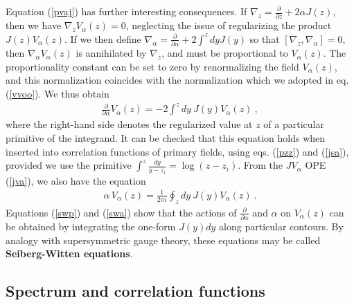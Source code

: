 \documentclass[12pt,a4paper,notitlepage]{report}
\newcommand \p {\partial}
\newcommand \pp[1] {{\frac{\p}{\p #1}}}
\numberwithin{equation}{section}
\theoremstyle{break}
\begin{document}
Equation (\ref{pvaj}) has further interesting consequences. If $\nabla_z=\pp{z} +2\alpha J(z)$, then we have $\nabla_z V_\alpha(z)=0$, neglecting the issue of regularizing the product $J(z)V_\alpha(z)$. If we then define $\nabla_\alpha = \pp{\alpha}+2\int^z dyJ(y)$ so that $[\nabla_z,\nabla_\alpha]=0$, then $\nabla_\alpha V_\alpha(z)$ is annihilated by $\nabla_z$, and must be proportional to $V_\alpha(z)$. The proportionality constant can be set to zero by renormalizing the field $V_\alpha(z)$, and this normalization coincides with the normalization which we adopted in eq. (\ref{vvoo}). We thus obtain
\begin{align}
 \pp{\alpha} V_\alpha(z) = -2 \int^z dy\ J(y)V_\alpha(z)\ ,
\label{swp}
\end{align}
where the right-hand side denotes the regularized value at $z$ of a particular primitive of the integrand. It can be checked that this equation holds when inserted into correlation functions of primary fields, using eqs. (\ref{pzz}) and (\ref{jsa}), provided we use the primitive $\int^z \frac{dy}{y-z_i} = \log(z-z_i)$.
From the $JV_\alpha$ OPE (\ref{jva}), we also have the equation
\begin{align}
 \alpha\, V_\alpha(z) = \frac{1}{2\pi i} \oint_{z} dy\ J(y)V_\alpha(z)\ .
\label{swa}
\end{align}
Equations (\ref{swp}) and (\ref{swa}) show that the actions of $\pp{\alpha}$ and $\alpha$ on $V_\alpha(z)$ can be obtained by integrating the one-form $J(y)dy$ along particular contours. By analogy with supersymmetric gauge theory, these equations may be called \textbf{\boldmath Seiberg-Witten equations}. 


\subsection{Spectrum and correlation functions \label{secsacf}}
\end{document}
